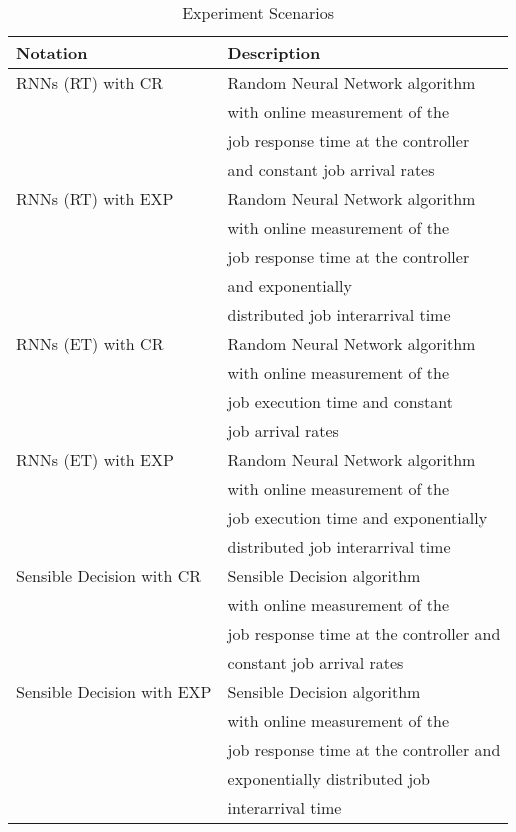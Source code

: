 \documentclass[journal]{IEEEtran}
\begin{document}
	\begin{table}[ht]
	\centering
	\begin{tabular}[scale=0.35]{l|l}
				\hline
				Notation&Description\\
				\hline
				RNNs (RT) with CR & Random Neural Network algorithm \\ &with online measurement of the \\ &job response time at the controller \\ &and constant job arrival rates\\
				\hline
				RNNs (RT) with EXP & Random Neural Network algorithm \\ &with online measurement of the \\ &job response time at the controller \\ &and exponentially \\&distributed job interarrival time\\
				\hline
				RNNs (ET) with CR & Random Neural Network algorithm \\ &with online measurement of the \\ &job execution time and constant \\ &job arrival rates\\
				\hline
				RNNs (ET) with EXP & Random Neural Network algorithm \\ &with online measurement of the \\ &job execution time and exponentially \\ &distributed job interarrival time\\
				\hline
				Sensible Decision with CR & Sensible Decision algorithm \\ &with online measurement of the \\ &job response time at the controller and \\ &constant job arrival rates\\
				\hline
				Sensible Decision with EXP & Sensible Decision algorithm \\ &with online measurement of the \\ &job response time at the controller and \\ &exponentially distributed job \\ &interarrival time\\
				\hline
			
			\end{tabular}  \\
		\caption{Experiment Scenarios}
	\label{tab:experimentscenarios}
\end{table}
\end{document}
